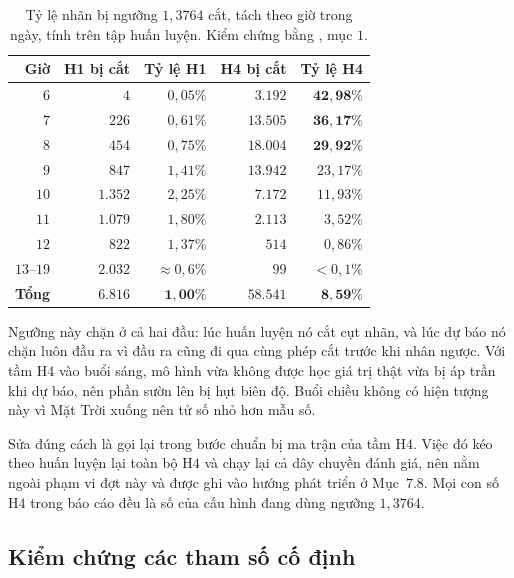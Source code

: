 \begin{table}[htbp]
\centering

\small
\begin{tabular}{r r r r r}
\toprule
\textbf{Giờ} & \textbf{H1 bị cắt} & \textbf{Tỷ lệ H1} & \textbf{H4 bị cắt} & \textbf{Tỷ lệ H4} \\
\midrule
$6$  & $4$     & $0{,}05\%$ & $3.192$  & $\mathbf{42{,}98\%}$ \\
$7$  & $226$   & $0{,}61\%$ & $13.505$ & $\mathbf{36{,}17\%}$ \\
$8$  & $454$   & $0{,}75\%$ & $18.004$ & $\mathbf{29{,}92\%}$ \\
$9$  & $847$   & $1{,}41\%$ & $13.942$ & $23{,}17\%$ \\
$10$ & $1.352$ & $2{,}25\%$ & $7.172$  & $11{,}93\%$ \\
$11$ & $1.079$ & $1{,}80\%$ & $2.113$  & $3{,}52\%$ \\
$12$ & $822$   & $1{,}37\%$ & $514$    & $0{,}86\%$ \\
$13$--$19$ & $2.032$ & $\approx 0{,}6\%$ & $99$ & $< 0{,}1\%$ \\
\midrule
\textbf{Tổng} & $\mathbf{6.816}$ & $\mathbf{1{,}00\%}$ & $\mathbf{58.541}$ & $\mathbf{8{,}59\%}$ \\
\bottomrule
\end{tabular}
\caption[Tỷ lệ nhãn bị ngưỡng $1{,}3764$ cắt, tách theo giờ trong ngày, tính trên tập huấn luyện]{Tỷ lệ nhãn bị ngưỡng $1{,}3764$ cắt, tách theo giờ trong ngày, tính trên tập huấn
luyện. Kiểm chứng bằng , mục $1$.}
\label{tab:cat_theo_gio}
\end{table}

Ngưỡng này chặn ở cả hai đầu: lúc huấn luyện nó cắt cụt nhãn, và lúc dự báo nó chặn luôn đầu
ra vì đầu ra cũng đi qua cùng phép cắt trước khi nhân ngược. Với tầm H$4$ vào buổi sáng, mô
hình vừa không được học giá trị thật vừa bị áp trần khi dự báo, nên phần sườn lên bị hụt biên
độ. Buổi chiều không có hiện tượng này vì Mặt Trời xuống nên tử số nhỏ hơn mẫu số.

Sửa đúng cách là gọi lại  trong bước chuẩn bị ma trận của tầm H$4$.
Việc đó kéo theo huấn luyện lại toàn bộ H$4$ và chạy lại cả dây chuyền đánh giá, nên nằm ngoài
phạm vi đợt này và được ghi vào hướng phát triển ở Mục~$7.8$. Mọi con số H$4$ trong báo cáo đều
là số của cấu hình đang dùng ngưỡng $1{,}3764$.

\FloatBarrier
\subsection{Kiểm chứng các tham số cố định}

